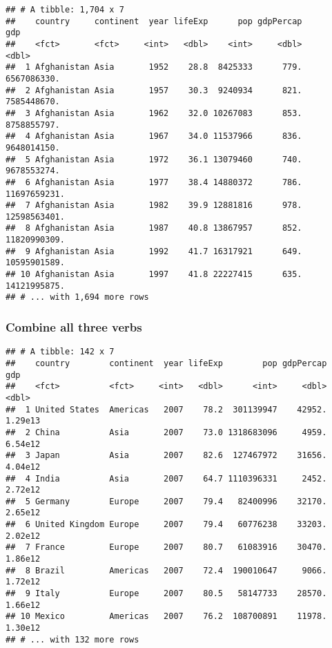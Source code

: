 \documentclass[]{article}
\newenvironment{Shaded}{\begin{snugshade}}{\end{snugshade}}
\newcommand{\KeywordTok}[1]{\textcolor[rgb]{0.13,0.29,0.53}{\textbf{#1}}}
\newcommand{\DataTypeTok}[1]{\textcolor[rgb]{0.13,0.29,0.53}{#1}}
\newcommand{\DecValTok}[1]{\textcolor[rgb]{0.00,0.00,0.81}{#1}}
\newcommand{\StringTok}[1]{\textcolor[rgb]{0.31,0.60,0.02}{#1}}
\newcommand{\OperatorTok}[1]{\textcolor[rgb]{0.81,0.36,0.00}{\textbf{#1}}}
\newcommand{\NormalTok}[1]{#1}
\begin{document}
\begin{verbatim}
## # A tibble: 1,704 x 7
##    country     continent  year lifeExp      pop gdpPercap          gdp
##    <fct>       <fct>     <int>   <dbl>    <int>     <dbl>        <dbl>
##  1 Afghanistan Asia       1952    28.8  8425333      779.  6567086330.
##  2 Afghanistan Asia       1957    30.3  9240934      821.  7585448670.
##  3 Afghanistan Asia       1962    32.0 10267083      853.  8758855797.
##  4 Afghanistan Asia       1967    34.0 11537966      836.  9648014150.
##  5 Afghanistan Asia       1972    36.1 13079460      740.  9678553274.
##  6 Afghanistan Asia       1977    38.4 14880372      786. 11697659231.
##  7 Afghanistan Asia       1982    39.9 12881816      978. 12598563401.
##  8 Afghanistan Asia       1987    40.8 13867957      852. 11820990309.
##  9 Afghanistan Asia       1992    41.7 16317921      649. 10595901589.
## 10 Afghanistan Asia       1997    41.8 22227415      635. 14121995875.
## # ... with 1,694 more rows
\end{verbatim}

\subsubsection{Combine all three verbs}\label{combine-all-three-verbs}

\begin{Shaded}
\end{Shaded}

\begin{verbatim}
## # A tibble: 142 x 7
##    country        continent  year lifeExp        pop gdpPercap     gdp
##    <fct>          <fct>     <int>   <dbl>      <int>     <dbl>   <dbl>
##  1 United States  Americas   2007    78.2  301139947    42952. 1.29e13
##  2 China          Asia       2007    73.0 1318683096     4959. 6.54e12
##  3 Japan          Asia       2007    82.6  127467972    31656. 4.04e12
##  4 India          Asia       2007    64.7 1110396331     2452. 2.72e12
##  5 Germany        Europe     2007    79.4   82400996    32170. 2.65e12
##  6 United Kingdom Europe     2007    79.4   60776238    33203. 2.02e12
##  7 France         Europe     2007    80.7   61083916    30470. 1.86e12
##  8 Brazil         Americas   2007    72.4  190010647     9066. 1.72e12
##  9 Italy          Europe     2007    80.5   58147733    28570. 1.66e12
## 10 Mexico         Americas   2007    76.2  108700891    11978. 1.30e12
## # ... with 132 more rows
\end{verbatim}
\end{document}
